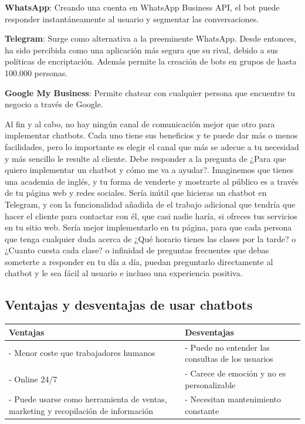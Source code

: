 {{\textbf{WhatsApp}: Creando una cuenta en WhatsApp Business API, el bot puede responder instantáneamente al usuario y segmentar las conversaciones. \vspace{0.3cm}

\textbf{Telegram}: Surge como alternativa a la preeminente WhatsApp. Desde entonces, ha sido percibida como una aplicación más segura que su rival, debido a sus políticas de encriptación. Además permite la creación de bots en grupos de hasta 100.000 personas.\vspace{0.3cm}

\textbf{Google My Business}: Permite chatear con cualquier persona que encuentre tu negocio a través de Google.

Al fin y al cabo, no hay ningún canal de comunicación mejor que otro para implementar chatbots. Cada uno tiene sus beneficios y te puede dar más o menos facilidades, pero lo importante es elegir el canal que más se adecue a tu necesidad y más sencillo le resulte al cliente. Debe responder a la pregunta de ¿Para que quiero implementar un chatbot y cómo me va a ayudar?. Imaginemos que tienes una academia de inglés, y tu forma de venderte y mostrarte al público es a través de tu página web y redes sociales. Sería inútil que hicieras un chatbot en Telegram, y con la funcionalidad añadida de el trabajo adicional que tendría que hacer el cliente para contactar con él, que casi nadie haría, si ofreces tus servicios en tu sitio web. Sería mejor implementarlo en tu página, para que cada persona que tenga cualquier duda acerca de ¿Qué horario tienes las clases por la tarde? o ¿Cuanto cuesta cada clase? o infinidad de preguntas frecuentes que debas someterte a responder en tu día a día, puedan preguntarlo directamente al chatbot y le sea fácil al usuario e incluso una experiencia positiva. 


\subsection{Ventajas y desventajas de usar chatbots}
{\vspace{0.5cm}

\begin{table}[!ht]
\begin{center}
\begin{tabular}{| p{6cm} | p{7cm} |}
\hline
\rowcolor{blueice}
\textbf{Ventajas} & \textbf{Desventajas} \\
 \hline
- Menor coste que trabajadores humanos & - Puede no entender las consultas de los usuarios \\
- Online 24/7 & - Carece de emoción y no es personalizable \\
- Puede usarse como herramienta de ventas, marketing y recopilación de información & - Necesitan mantenimiento constante \\ \hline
\end{tabular}
\end{center}
\end{table}



}}}
